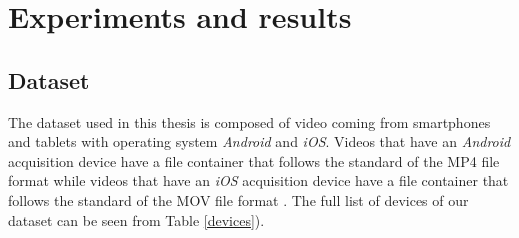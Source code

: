 \chapter{Experiments and results}

\section{Dataset}

The dataset used in this thesis is composed of video coming from smartphones and tablets with operating system \emph{Android} and \emph{iOS}. 
Videos that have an \emph{Android} acquisition device have a file container that follows the standard of the MP4 \cite{mp4} file format while videos that have an \emph{iOS} acquisition device have a file container that follows the standard of the MOV file format \cite{mov}.
The full list of devices of our dataset can be seen from Table \ref{devices}). 

